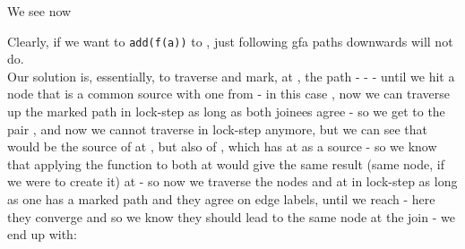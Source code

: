 We see now 

Clearly, if we want to \lstinline{add(f(a))} to , just following gfa paths downwards will not do.\\
Our solution is, essentially, to traverse and mark, at , the path  -  -  - \s{()} until we hit a node that is a common source with one from  - in this case \s{()}, 
now we can traverse up the marked path in lock-step as long as both joinees agree - so we get to the pair \m{[\s{b},\s{a,b}]}, 
and now we cannot traverse in lock-step anymore, but we can see that  would be the source of  at , 
but also of , which has  at  as a source - so we know that applying the function  to both at  
would give the same result (same node, if we were to create it) at  - 
so now we traverse the nodes  and  at  in lock-step as long as one has a marked path and they agree on edge labels, until we reach  - here they converge and so we know they should lead to the same node at the join - we end up with:
